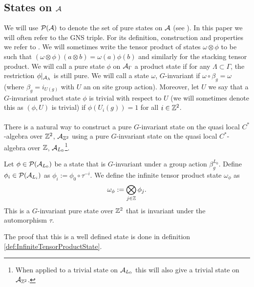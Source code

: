\documentclass[11pt,a4paper,twoside]{article}
\numberwithin{equation}{section}
\begin{document}
\subsection{States on $\AA$}\label{sec:States}
We will use $\PP(\AA)$ to denote the set of pure states on $\AA$ (see \cite{bratteli1979operator}). In this paper we will often refer to the GNS triple. For its definition, construction and properties we refer to \cite{bratteli1979operator}. We will sometimes write the tensor product of states $\omega\otimes\phi$ to be such that $(\omega\otimes\phi)(a\otimes b)=\omega(a)\phi(b)$ and similarly for the stacking tensor product. We will call a pure state $\phi$ on $\AA_\Gamma$ a product state if for any $\Lambda\subset\Gamma$, the restriction $\phi|_{\AA_\Lambda}$ is still pure. We will call a state $\omega$, $G$-invariant if $\omega\circ\beta_g=\omega$ (where $\beta_g=i_{U(g)}$ with $U$ an on site group action). Moreover, let $U$ we say that a $G$-invariant product state $\phi$ is trivial with respect to $U$ (we will sometimes denote this as $(\phi,U)$ is trivial) if $\phi(U_i(g))=1$ for all $i\in\ZZ^2$.\\\\
There is a natural way to construct a pure $G$-invariant state on the quasi local $C^*$-algebra over $\ZZ^2$, $\AA_{\ZZ^2}$ using a pure $G$-invariant state on the quasi local $C^*$-algebra over $\ZZ$, $\AA_{L_0}$\footnote{When applied to a trivial state on $\AA_{L_0}$ this will also give a trivial state on $\AA_{\ZZ^2}$.}.
\begin{definition}\label{def:InfiniteTensorProduct}
	Let $\phi\in\PP(\AA_{L_0})$ be a state that is $G$-invariant under a group action $\beta_g^{L_0}$. Define $\phi_i\in\PP(\AA_{L_i})$ as $\phi_i:=\phi_0\circ\tau^{-i}$. We define the infinite tensor product state $\omega_\phi$ as
	\begin{equation}
		\omega_\phi:=\bigotimes_{j\in\ZZ}\phi_j.
	\end{equation}
	This is a $G$-invariant pure state over $\ZZ^2$ that is invariant under the automorphism $\tau$.
\end{definition}
The proof that this is a well defined state is done in definition \ref{def:InfiniteTensorProductState}.
\end{document}

